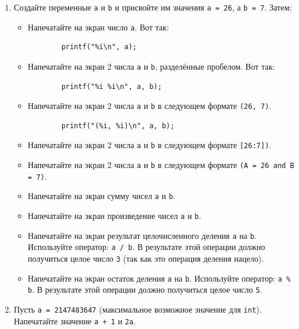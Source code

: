 \documentclass{article}
\begin{document}
\begin{enumerate}
\item Создайте переменные \texttt{a} и \texttt{b} и присвойте им значения \texttt{a = 26}, а \texttt{b = 7}. Затем:
	\begin{itemize}
	\item Напечатайте на экран число \texttt{a}. Вот так:
		\begin{lstlisting}
		printf("%i\n", a);
		\end{lstlisting}
	\item Напечатайте на экран 2 числа \texttt{a} и \texttt{b}, разделённые пробелом. Вот так:
		\begin{lstlisting}
		printf("%i %i\n", a, b);
		\end{lstlisting}
	\item Напечатайте на экран 2 числа \texttt{a} и \texttt{b} в следующем формате \texttt{(26, 7)}.
		\begin{lstlisting}
		printf("(%i, %i)\n", a, b);
		\end{lstlisting}
	
	\item Напечатайте на экран 2 числа \texttt{a} и \texttt{b} в следующем формате \texttt{[26:7])}.
	\item Напечатайте на экран 2 числа \texttt{a} и \texttt{b} в следующем формате \texttt{(A = 26 and B = 7)}.
	\item Напечатайте на экран сумму чисел \texttt{a} и \texttt{b}.
	\item Напечатайте на экран произведение чисел \texttt{a} и \texttt{b}.
	\item Напечатайте на экран результат целочисленного деления \texttt{a} на \texttt{b}. Используйте оператор: \texttt{a / b}. В результате этой
		операции должно получиться целое число \texttt{3} (так как это операция деления нацело).
	\item Напечатайте на экран остаток деления \texttt{a} на \texttt{b}. Используйте оператор: \texttt{a \% b}. В результате этой
		операции должно получиться целое число \texttt{5}.
	\end{itemize}
\item Пусть \texttt{a = 2147483647} (максимальное возможное значение для \texttt{int}). Напечатайте значение \texttt{a + 1} и \texttt{2a}.
\end{enumerate}
\end{document}
